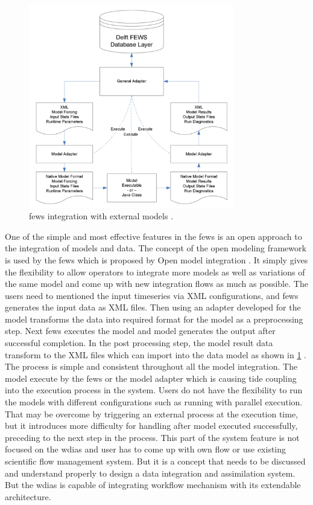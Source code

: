 \begin{figure}[htp]
    \centering
    \includegraphics[width=0.8\textwidth]{lit/fews/Linking-Delft-FEWS-with-external-models-The-fi-gure-shows-the-fl-ow-of-data-through-XML_W640.png}
    \caption[\acrshort{fews} integration with external models]{\acrshort{fews} integration with external models \cite{Werner2013TheSystem}.}
    \label{fi:fews_general_adapter}
\end{figure}
One of the simple and most effective features in the \acrshort{fews} is an open approach to the integration of models and data. The concept of the open modeling framework is used by the \acrshort{fews} which is proposed by Open model integration \cite{Kokkonen2003InterfacingXML}. It simply gives the flexibility to allow operators to integrate more models as well as variations of the same model and come up with new integration flows as much as possible.
The users need to mentioned the input timeseries via XML configurations, and \acrshort{fews} generates the input data as XML files. Then using an adapter developed for the model transforms the data into required format for the model as a preprocessing step. Next \acrshort{fews} executes the model and model generates the output after successful completion. In the post processing step, the model result data transform to the XML files which can import into the data model as shown in \cref{fi:fews_general_adapter} \cite{Werner2013TheSystem}. The process is simple and consistent throughout all the model integration. The model execute by the \acrshort{fews} or the model adapter which is causing tide coupling into the execution process in the system. Users do not have the flexibility to run the models with different configurations such as running with parallel execution. That may be overcome by triggering an external process at the execution time, but it introduces more difficulty for handling after model executed successfully, preceding to the next step in the process. This part of the system feature is not focused on the \acrshort{wdias} and user has to come up with own flow or use existing scientific flow management system. But it is a concept that needs to be discussed and understand properly to design a data integration and assimilation system. But the \acrshort{wdias} is capable of integrating workflow mechanism with its extendable architecture.

